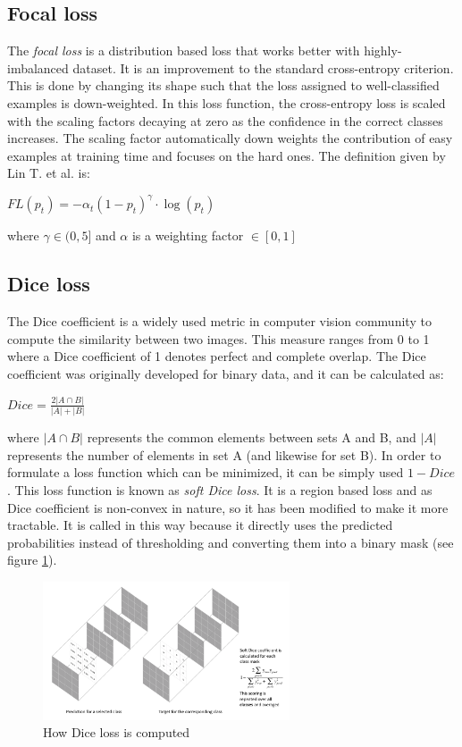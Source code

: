 \documentclass[a4paper,10pt]{report}
\begin{document}
\subsection{Focal loss}\label{subsec:subsection-361}
The \textit{focal loss} is a distribution based loss that works better with highly-imbalanced dataset.
It is an improvement to the standard cross-entropy criterion. This is done by changing its shape such that the loss assigned to well-classified examples is down-weighted. In this loss function, the cross-entropy loss is scaled with the scaling factors decaying at zero as the confidence in the correct classes increases. The scaling factor automatically down weights the contribution of easy examples at training time and focuses on the hard ones.
The definition given by Lin T. et al. \cite{focal_loss} is: 
\begin{center}
    $FL(p_t) = -\alpha_t(1 - p_t)^\gamma \cdot \log(p_t)$
\end{center}
where $\gamma \in (0,5]$ and $\alpha$ is a weighting factor $\in [0,1]$

\subsection{Dice loss}\label{subsec:subsection-362}
The Dice coefficient is a widely used metric in computer
vision community to compute the similarity between two
images. This measure ranges from 0 to 1 where a Dice coefficient of 1 denotes perfect and complete overlap. The Dice coefficient was originally developed for binary data, and it can be calculated as: 
\begin{center}
    $Dice = \frac{{2\left| {A \cap B} \right|}}{{\left| A \right| + \left| B \right|}}$
\end{center}

where $\left| {A \cap B} \right|$ represents the common elements between sets A and B, and $\left| A \right|$ represents the number of elements in set A (and likewise for set B).
In order to formulate a loss function which can be minimized, it can be simply used $1 - Dice$. This loss function is known as \textit{soft Dice loss}. It is a region based loss and as Dice coefficient is non-convex in nature, so it has been modified to make it more tractable. It is called in this way because it directly uses the predicted probabilities instead of thresholding and converting them into a binary mask (see figure \ref{fig:dice_loss}). 

\begin{figure}[h]
    \centering
    \includegraphics[width=0.65\textwidth]{assets/img/dice_loss.png}
    \caption{How Dice loss is computed \cite{semantic-segmentation}}
    \label{fig:dice_loss}
\end{figure}
\end{document}
